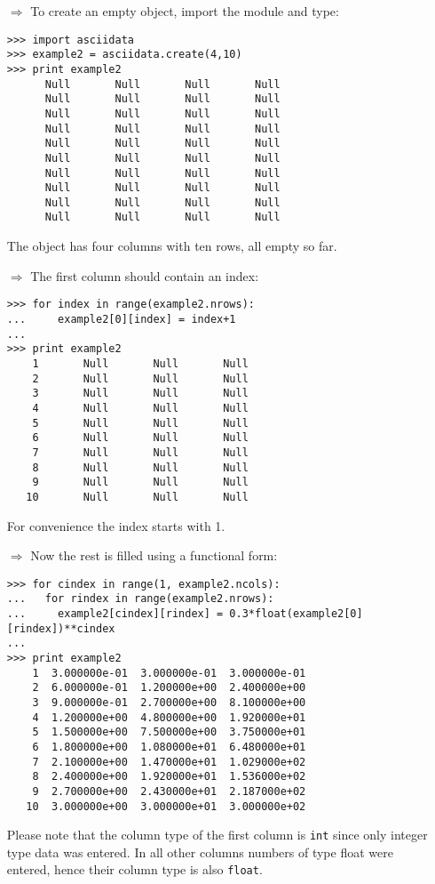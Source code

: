 \begin{itemize}
\item[$\Rightarrow$] To create an empty \ad object, import the \AAD module
and type:
\begin{small}
\begin{verbatim}
>>> import asciidata
>>> example2 = asciidata.create(4,10)
>>> print example2
      Null       Null       Null       Null
      Null       Null       Null       Null
      Null       Null       Null       Null
      Null       Null       Null       Null
      Null       Null       Null       Null
      Null       Null       Null       Null
      Null       Null       Null       Null
      Null       Null       Null       Null
      Null       Null       Null       Null
      Null       Null       Null       Null
\end{verbatim}
\end{small}
The object has four columns with ten rows, all empty so far.

\item[$\Rightarrow$] The first column should contain an index:
\begin{small}
\begin{verbatim}
>>> for index in range(example2.nrows):
...     example2[0][index] = index+1
... 
>>> print example2
    1       Null       Null       Null
    2       Null       Null       Null
    3       Null       Null       Null
    4       Null       Null       Null
    5       Null       Null       Null
    6       Null       Null       Null
    7       Null       Null       Null
    8       Null       Null       Null
    9       Null       Null       Null
   10       Null       Null       Null
\end{verbatim}
\end{small}
For convenience the index starts with 1.

\item[$\Rightarrow$] Now the rest is filled using a functional form:
\begin{small}
\begin{verbatim}
>>> for cindex in range(1, example2.ncols):
...   for rindex in range(example2.nrows):
...     example2[cindex][rindex] = 0.3*float(example2[0][rindex])**cindex
... 
>>> print example2
    1  3.000000e-01  3.000000e-01  3.000000e-01
    2  6.000000e-01  1.200000e+00  2.400000e+00
    3  9.000000e-01  2.700000e+00  8.100000e+00
    4  1.200000e+00  4.800000e+00  1.920000e+01
    5  1.500000e+00  7.500000e+00  3.750000e+01
    6  1.800000e+00  1.080000e+01  6.480000e+01
    7  2.100000e+00  1.470000e+01  1.029000e+02
    8  2.400000e+00  1.920000e+01  1.536000e+02
    9  2.700000e+00  2.430000e+01  2.187000e+02
   10  3.000000e+00  3.000000e+01  3.000000e+02
\end{verbatim}
\end{small}
Please note that the column type of the first column is {\tt int}
since only integer type data was entered. In all other columns
numbers of type float were entered, hence their column type
is also {\tt float}.


\end{itemize}
